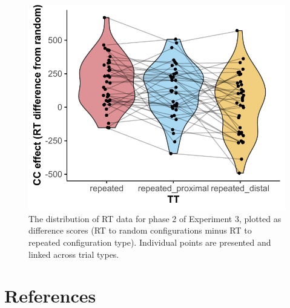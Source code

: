\documentclass[
  man,floatsintext]{apa7}
\begin{document}
\begin{figure}

{\centering \includegraphics{CCC_ms1_files/figure-latex/Exp3-Phase-2-RTdiff-figure-1} 

}

\caption{The distribution of RT data for phase 2 of Experiment 3, plotted as difference scores (RT to random configurations minus RT to repeated configuration type). Individual points are presented and linked across trial types.}\label{fig:Exp3-Phase-2-RTdiff-figure}
\end{figure}



\newpage

\hypertarget{references}{%
\section*{References}\label{references}}
\end{document}
